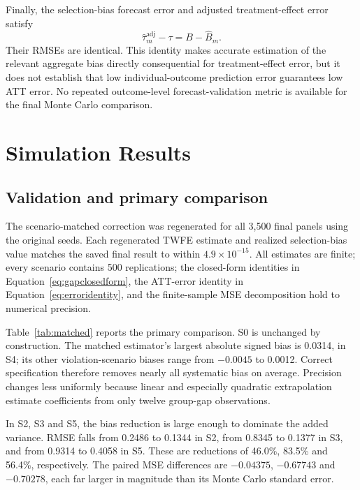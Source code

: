 \documentclass[11pt,a4paper]{article}
\begin{document}
Finally, the selection-bias forecast error and adjusted treatment-effect error satisfy
\begin{equation}\label{eq:erroridentity}
\widehat\tau_m^{\mathrm{adj}}-\tau=B-\widehat B_m.
\end{equation}
Their RMSEs are identical. This identity makes accurate estimation of the relevant aggregate bias directly consequential for treatment-effect error, but it does not establish that low individual-outcome prediction error guarantees low ATT error. No repeated outcome-level forecast-validation metric is available for the final Monte Carlo comparison.

\section{Simulation Results}\label{sec:results}
\subsection{Validation and primary comparison}
The scenario-matched correction was regenerated for all 3,500 final panels using the original seeds. Each regenerated TWFE estimate and realized selection-bias value matches the saved final result to within $4.9\times10^{-15}$. All estimates are finite; every scenario contains 500 replications; the closed-form identities in Equation~\ref{eq:gapclosedform}, the ATT-error identity in Equation~\ref{eq:erroridentity}, and the finite-sample MSE decomposition hold to numerical precision.

Table~\ref{tab:matched} reports the primary comparison. S0 is unchanged by construction. The matched estimator's largest absolute signed bias is 0.0314, in S4; its other violation-scenario biases range from $-0.0045$ to 0.0012. Correct specification therefore removes nearly all systematic bias on average. Precision changes less uniformly because linear and especially quadratic extrapolation estimate coefficients from only twelve group-gap observations.



In S2, S3 and S5, the bias reduction is large enough to dominate the added variance. RMSE falls from 0.2486 to 0.1344 in S2, from 0.8345 to 0.1377 in S3, and from 0.9314 to 0.4058 in S5. These are reductions of 46.0\%, 83.5\% and 56.4\%, respectively. The paired MSE differences are $-0.04375$, $-0.67743$ and $-0.70278$, each far larger in magnitude than its Monte Carlo standard error.
\end{document}

